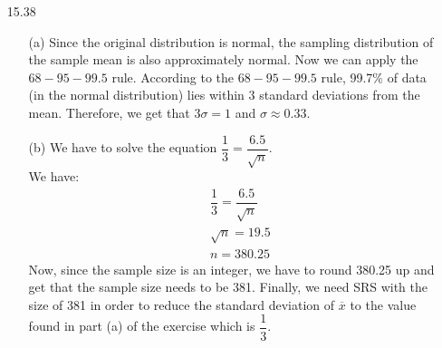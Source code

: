 \documentclass[11pt, a4paper]{article}
\begin{document}
\begin{itemize}
\item[]
\item[]

\item[15.38]
\begin{itemize}
\item[(a)]
Since the original distribution is normal, the sampling distribution of the sample mean is also
approximately normal. Now we can apply the $68-95-99.5$ rule.
According to the $68-95-99.5$ rule, 99.7\% of data (in the normal distribution)
lies within 3 standard deviations from the mean. Therefore, we get that $3\sigma = 1$
and $\sigma \approx 0.33$.

\item[]

\item[(b)]
We have to solve the equation $\dfrac{1}{3} = \dfrac{6.5}{\sqrt{n}}$.\\
We have:
\begin{align}
&\dfrac{1}{3} = \dfrac{6.5}{\sqrt{n}}\\
&\sqrt{n} = 19.5\\
&n = 380.25
\end{align}
Now, since the sample size is an integer, we have to round 380.25 up
and get that the sample size needs to be 381. Finally, we need SRS with
the size of 381 in order to reduce the standard deviation of $\overline{x}$
to the value found in part (a) of the exercise which is $\dfrac{1}{3}$.
\end{itemize}

\end{itemize}
\end{document}
